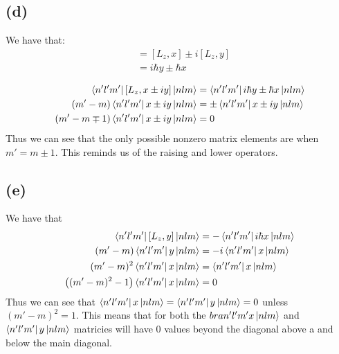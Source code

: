 \documentclass[11pt]{article}
\begin{document}
\subsection*{(d)}
We have that:
\begin{align*}
    [L_z,x\pm i y] &= [L_z,x]\pm i[L_z,y]\\
    &= i\hbar y\pm \hbar x\\
\end{align*}
\begin{align*}
    \bra{n'l'm'}[L_z,x\pm i y]\ket{nlm} &=  \bra{n'l'm'}i\hbar y\pm \hbar x\ket{nlm}\\
    (m'-m)\bra{n'l'm'}x\pm iy\ket{nlm} &= \pm\bra{n'l'm'}x\pm iy\ket{nlm}\\
    (m'-m\mp 1)\bra{n'l'm'}x\pm iy\ket{nlm} &= 0
\end{align*}
Thus we can see that the only possible nonzero matrix elements are when $m'=m\pm 1$. This 
reminds us of the raising and lower operators.
\subsection*{(e)}
We have that 
\begin{align*}
    \bra{n'l'm'}[L_z,y]\ket{nlm} &= -\bra{n'l'm'}i\hbar x\ket{nlm}\\
    (m'-m) \bra{n'l'm'}y\ket{nlm} &= -i\bra{n'l'm'}x\ket{nlm}\\
    (m'-m)^2 \bra{n'l'm'}x\ket{nlm} &= \bra{n'l'm'}x\ket{nlm}\\
    \left((m'-m)^2-1\right)\bra{n'l'm'}x\ket{nlm} &= 0
\end{align*}
Thus we can see that $\bra{n'l'm'}x\ket{nlm}= \bra{n'l'm'}y\ket{nlm} = 0$
unless $(m'-m)^2=1$. This means that for both the $bra{n'l'm'}x\ket{nlm}$ and 
$\bra{n'l'm'}y\ket{nlm}$ matricies will have 0 values beyond the diagonal above a
and below the main diagonal. 
\end{document}
